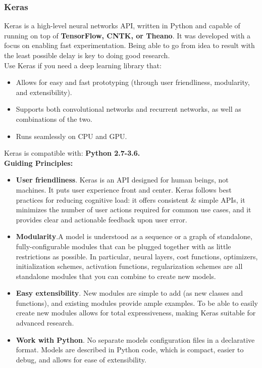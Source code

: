 \subsubsection{Keras}
Keras is a high-level neural networks API, written in Python and capable of running on top of \textbf{TensorFlow, CNTK, or Theano}. It was developed with a focus on enabling fast experimentation. Being able to go from idea to result with the least possible delay is key to doing good research.
\\
Use Keras if you need a deep learning library that:
\begin{itemize}
	\item Allows for easy and fast prototyping (through user friendliness, modularity, and extensibility).
	\item Supports both convolutional networks and recurrent networks, as well as combinations of the two.
	\item Runs seamlessly on CPU and GPU.
\end{itemize}
Keras is compatible with: \textbf{Python 2.7-3.6.}
\\
\textbf{Guiding Principles:}
\begin{itemize}
	\item \textbf{User friendliness}. Keras is an API designed for human beings, not machines. It puts user experience front and center. Keras follows best practices for reducing cognitive load: it offers consistent \& simple APIs, it minimizes the number of user actions required for common use cases, and it provides clear and actionable feedback upon user error.
	\item \textbf{Modularity}.A model is understood as a sequence or a graph of standalone, fully-configurable modules that can be plugged together with as little restrictions as possible. In particular, neural layers, cost functions, optimizers, initialization schemes, activation functions, regularization schemes are all standalone modules that you can combine to create new models.
	\item \textbf{Easy extensibility}. New modules are simple to add (as new classes and functions), and existing modules provide ample examples. To be able to easily create new modules allows for total expressiveness, making Keras suitable for advanced research.
	\item \textbf{Work with Python}. No separate models configuration files in a declarative format. Models are described in Python code, which is compact, easier to debug, and allows for ease of extensibility.
\end{itemize}
